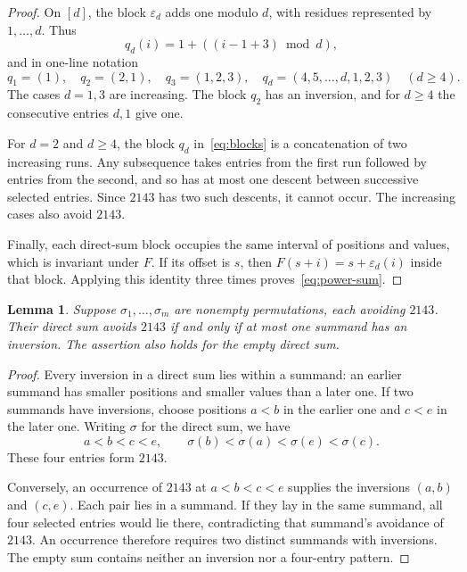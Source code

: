 \documentclass[11pt]{article}
\newtheorem{lemma}[theorem]{Lemma}
\newcommand{\eps}{\varepsilon}
\begin{document}
\begin{proof}
On $[d]$, the block $\eps_d$ adds one modulo $d$, with residues
represented by $1,\ldots,d$. Thus
\[
q_d(i)=1+((i-1+3)\bmod d),
\]
and in one-line notation
\begin{equation}\label{eq:blocks}
q_1=(1),\quad q_2=(2,1),\quad q_3=(1,2,3),\quad
q_d=(4,5,\ldots,d,1,2,3)\quad(d\geq4).
\end{equation}
The cases $d=1,3$ are increasing. The block $q_2$ has an inversion,
and for $d\geq4$ the consecutive entries $d,1$ give one.

For $d=2$ and $d\geq4$, the block $q_d$ in~\eqref{eq:blocks} is a
concatenation of two increasing runs. Any subsequence takes entries from the first
run followed by entries from the second, and so has at most one descent
between successive selected entries. Since $2143$ has two such
descents, it cannot occur. The increasing cases also avoid $2143$.

Finally, each direct-sum block occupies the same interval of positions
and values, which is invariant under $F$. If its offset is $s$, then
$F(s+i)=s+\eps_d(i)$ inside that block. Applying this identity three
times proves~\eqref{eq:power-sum}.
\end{proof}

\begin{lemma}\label{lem:two-inversions}
Suppose $\sigma_1,\ldots,\sigma_m$ are nonempty permutations, each
avoiding $2143$. Their direct sum avoids $2143$ if and only if at most
one summand has an inversion. The assertion also holds for the empty
direct sum.
\end{lemma}

\begin{proof}
Every inversion in a direct sum lies within a summand: an earlier
summand has smaller positions and smaller values than a later one.
If two summands have inversions, choose positions $a<b$ in the earlier
one and $c<e$ in the later one. Writing $\sigma$ for the direct sum,
we have
\[
a<b<c<e,\qquad
\sigma(b)<\sigma(a)<\sigma(e)<\sigma(c).
\]
These four entries form $2143$.

Conversely, an occurrence of $2143$ at $a<b<c<e$ supplies the
inversions $(a,b)$ and $(c,e)$. Each pair lies in a summand. If they
lay in the same summand, all four selected entries would lie there,
contradicting that summand's avoidance of $2143$. An occurrence therefore
requires two distinct summands with inversions. The empty sum contains
neither an inversion nor a four-entry pattern.
\end{proof}
\end{document}
